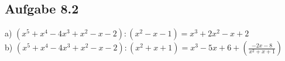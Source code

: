 \documentclass{standalone}
\begin{document}
\subsection{Aufgabe 8.2}

a) $(x^5+x^4-4x^3+x^2-x-2):(x^2-x-1)=x^3+2x^2-x+2$\\
b) $(x^5+x^4-4x^3+x^2-x-2):(x^2+x+1)=x^3-5x+6+\left(\frac{-2x-8}{x^2+x+1}\right)$
\end{document}
